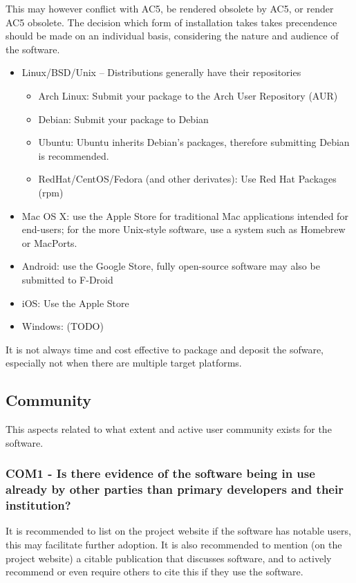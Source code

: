 \documentclass[a4paper,11pt]{article}
\begin{document}
This may however conflict with AC5, be rendered obsolete by AC5, or render AC5
obsolete. The decision which form of installation takes takes precendence should be
made on an individual basis, considering the nature and audience of the
software.

\begin{itemize}
    \item Linux/BSD/Unix -- Distributions generally have their repositories
    \begin{itemize}
        \item Arch Linux: Submit your package to the Arch User Repository (AUR)
        \item Debian: Submit your package to Debian
        \item Ubuntu: Ubuntu inherits Debian's packages, therefore submitting Debian is recommended.
        \item RedHat/CentOS/Fedora (and other derivates): Use Red Hat Packages (rpm)
    \end{itemize}
    \item Mac OS X: use the Apple Store for traditional Mac applications intended for end-users; for the more Unix-style
        software, use a system such as Homebrew or MacPorts.
    \item Android: use the Google Store, fully open-source software may also be
        submitted to F-Droid
    \item iOS: Use the Apple Store
    \item Windows: (TODO) 
\end{itemize}

It is not always time and cost effective to package and deposit the sofware, especially not
when there are multiple target platforms. 

\subsection{Community}

This aspects related to what extent and active user community exists for the
software.

\subsubsection{COM1 - Is there evidence of the software being in use already by
other parties than primary developers and their institution?}

It is recommended to list on the project website if the software has notable
users, this may facilitate further adoption. It is also recommended to mention
(on the project website) a citable publication that discusses software, and to
actively recommend or even require others to cite this if they use the
software.
\end{document}
